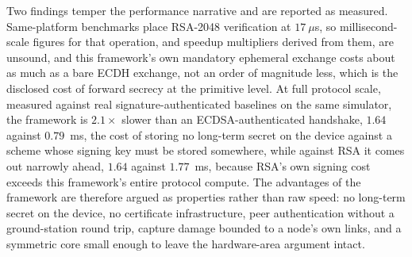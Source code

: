 \documentclass[journal]{IEEEtran}
\begin{document}
Two findings temper the performance narrative and are reported as measured.
Same-platform benchmarks place RSA-2048 verification at $17~\mu$s, so
millisecond-scale figures for that operation, and speedup multipliers derived
from them, are unsound, and this framework's own mandatory ephemeral exchange
costs about as much as a bare ECDH exchange, not an order of magnitude less,
which is the disclosed cost of forward secrecy at the primitive level. At full
protocol scale, measured against real signature-authenticated baselines on the
same simulator, the framework is $2.1\times$ slower than an
ECDSA-authenticated handshake, $1.64$ against $0.79$~ms, the cost of storing no
long-term secret on the device against a scheme whose signing key must be
stored somewhere, while against RSA it comes out narrowly ahead, $1.64$ against
$1.77$~ms, because RSA's own signing cost exceeds this framework's entire
protocol compute. The advantages of the framework are therefore argued as properties
rather than raw speed: no long-term secret on the device, no certificate
infrastructure, peer authentication without a ground-station round trip,
capture damage bounded to a node's own links, and a symmetric core small enough
to leave the hardware-area argument intact.
\end{document}
